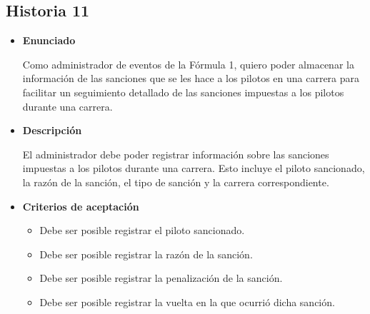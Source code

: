 \documentclass{article}
\begin{document}
	\subsection{Historia 11}
	\begin{itemize}
		
		\item \large{\textbf{Enunciado}}
		\begin{description}
			Como administrador de eventos de la Fórmula 1, quiero poder almacenar la información de las sanciones que se les hace a los pilotos en una carrera para facilitar un seguimiento detallado de las sanciones impuestas a los pilotos durante una carrera.
			
		\end{description}
		
		\item \large{\textbf{Descripción}}
		\begin{description}
			El administrador debe poder registrar información sobre las sanciones impuestas a los pilotos durante una carrera. Esto incluye el piloto sancionado, la razón de la sanción, el tipo de sanción y la carrera correspondiente. 
			
		\end{description}
		
		\item \large{\textbf{Criterios de aceptación}}
		\begin{itemize}
			\item Debe ser posible registrar el piloto sancionado.
			\item Debe ser posible registrar la razón de la sanción.
			\item Debe ser posible registrar la penalización de la sanción. 
			\item Debe ser posible registrar la vuelta en la que ocurrió dicha sanción.
			
		\end{itemize}
		
	\end{itemize}
	
\end{document}
